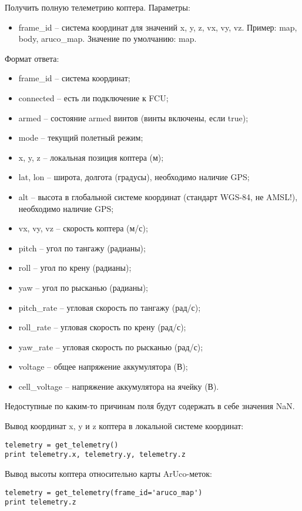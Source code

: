 Получить полную телеметрию коптера.
Параметры:
\begin{itemize}
    \item frame\_id – система координат для значений x, y, z, vx, vy, vz. Пример: map, body, aruco\_map. Значение по умолчанию: map.
\end{itemize}
Формат ответа:
\begin{itemize}
    \item frame\_id – система координат;
    \item connected – есть ли подключение к FCU;
    \item armed – состояние armed винтов (винты включены, если true);
    \item mode – текущий полетный режим;
    \item x, y, z – локальная позиция коптера (м);
    \item lat, lon – широта, долгота (градусы), необходимо наличие GPS;
    \item alt – высота в глобальной системе координат (стандарт WGS-84, не AMSL!), необходимо наличие GPS;
    \item vx, vy, vz – скорость коптера (м/с);
    \item pitch – угол по тангажу (радианы);
    \item roll – угол по крену (радианы);
    \item yaw – угол по рысканью (радианы);
    \item pitch\_rate – угловая скорость по тангажу (рад/с);
    \item roll\_rate – угловая скорость по крену (рад/с);
    \item yaw\_rate – угловая скорость по рысканью (рад/с);
    \item voltage – общее напряжение аккумулятора (В);
    \item cell\_voltage – напряжение аккумулятора на ячейку (В).
\end{itemize}

Недоступные по каким-то причинам поля будут содержать в себе значения NaN.

Вывод координат x, y и z коптера в локальной системе координат:
\begin{verbatim}
telemetry = get_telemetry()
print telemetry.x, telemetry.y, telemetry.z
\end{verbatim}

Вывод высоты коптера относительно карты ArUco-меток:
\begin{verbatim}
telemetry = get_telemetry(frame_id='aruco_map')
print telemetry.z
\end{verbatim}

